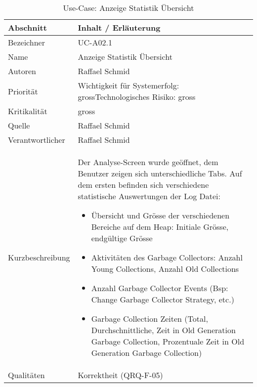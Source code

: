 \begin{longtable}{|p{4cm}|p{10.5cm}|}
\caption{Use-Case: Anzeige Statistik Übersicht}\\\hline
   \textbf{Abschnitt} & \textbf{Inhalt / Erläuterung} \\\hline
   Bezeichner & UC-A02.1\\\hline
   Name & Anzeige Statistik Übersicht\\\hline
   Autoren & Raffael Schmid\\\hline
   Priorität & Wichtigkeit für Systemerfolg: gross\newline Technologisches Risiko: gross\\\hline
   Kritikalität & gross\\\hline
   Quelle & Raffael Schmid\\\hline
   Verantwortlicher & Raffael Schmid\\\hline
   Kurzbeschreibung & Der Analyse-Screen wurde geöffnet, dem Benutzer zeigen sich unterschiedliche Tabs. Auf dem ersten befinden sich verschiedene statistische Auswertungen der Log Datei:
   \begin{itemize}
	\item Übersicht und Grösse der verschiedenen Bereiche auf dem Heap: Initiale Grösse, endgültige Grösse
	\item Aktivitäten des Garbage Collectors: Anzahl Young Collections, Anzahl Old Collections
	\item Anzahl Garbage Collector Events (Bsp: Change Garbage Collector Strategy, etc.)
	\item Garbage Collection Zeiten (Total, Durchschnittliche, Zeit in Old Generation Garbage Collection, Prozentuale Zeit in Old Generation Garbage Collection)
   \end{itemize}
 \\\hline
   Qualitäten & Korrektheit (QRQ-F-05)\\\hline
\end{longtable}

